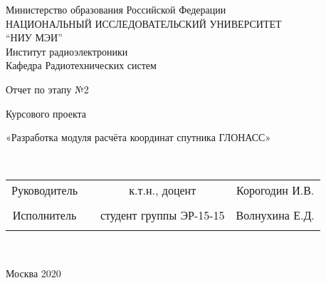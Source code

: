 \documentclass[]{article}
\begin{document}
\begin{center}
	\hfill \break
	\large{Министерство образования Российской Федерации}\\
	\large{НАЦИОНАЛЬНЫЙ ИССЛЕДОВАТЕЛЬСКИЙ УНИВЕРСИТЕТ}\\ 
	\large{“НИУ МЭИ”}\\

	\hfill \break
	\normalsize{Институт радиоэлектроники}\\
	\hfill \break
	\normalsize{Кафедра Радиотехнических систем}\\
	\hfill\break
	\hfill \break
	\hfill \break
	\hfill \break
	\large{Отчет по этапу №2
		
		Курсового проекта
		 
		«Разработка модуля расчёта координат спутника ГЛОНАСС»	}\\
	\hfill \break
	\hfill \break
	\hfill \break
	
		\hfill \break
	
		\hfill \break
	
	\hfill \break
	\hfill \break
\end{center}

\hfill \break
\hfill \break

\normalsize{ 
	\begin{tabular}{cccc}
		
	
		Руководитель & \underline{\hspace{3cm}}& к.т.н., доцент & Корогодин И.В. \\\\
		
		Исполнитель & \underline{\hspace{3cm}} &студент группы ЭР-15-15 &Волнухина Е.Д. \\\\
	\end{tabular}
}\\
\hfill \break
\hfill \break
\begin{center} Москва 2020 \end{center}
\thispagestyle{empty} %

\tableofcontents
\end{document}
